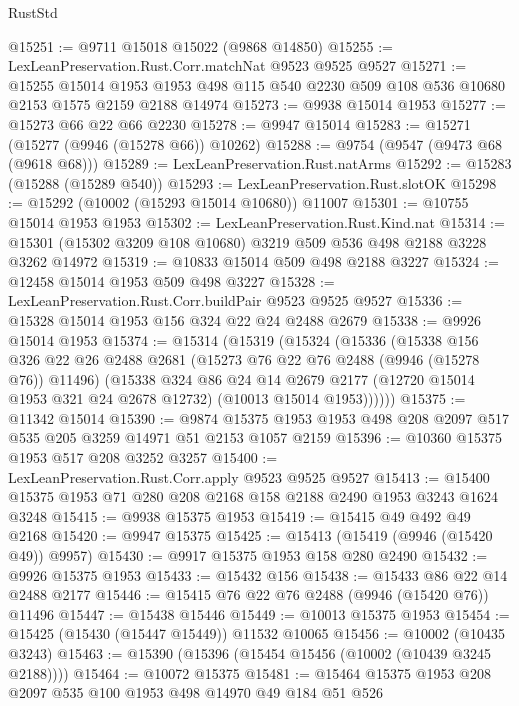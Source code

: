 \begin{lexlean}{RustStd}
\begin{coremodule}
@15251 := @9711 @15018 @15022 (@9868 @14850)
@15255 := LexLeanPreservation.Rust.Corr.matchNat @9523 @9525 @9527
@15271 := @15255
    @15014
    @1953
    @1953
    @498
    @115
    @540
    @2230
    @509
    @108
    @536
    @10680
    @2153
    @1575
    @2159
    @2188
    @14974
@15273 := @9938 @15014 @1953
@15277 := @15273 @66 @22 @66 @2230
@15278 := @9947 @15014
@15283 := @15271 (@15277 (@9946 (@15278 @66)) @10262)
@15288 := @9754 (@9547 (@9473 @68 (@9618 @68)))
@15289 := LexLeanPreservation.Rust.natArms
@15292 := @15283 (@15288 (@15289 @540))
@15293 := LexLeanPreservation.Rust.slotOK
@15298 := @15292 (@10002 (@15293 @15014 @10680)) @11007
@15301 := @10755 @15014 @1953 @1953
@15302 := LexLeanPreservation.Rust.Kind.nat
@15314 := @15301 (@15302 @3209 @108 @10680) @3219 @509 @536 @498 @2188 @3228 @3262 @14972
@15319 := @10833 @15014 @509 @498 @2188 @3227
@15324 := @12458 @15014 @1953 @509 @498 @3227
@15328 := LexLeanPreservation.Rust.Corr.buildPair @9523 @9525 @9527
@15336 := @15328 @15014 @1953 @156 @324 @22 @24 @2488 @2679
@15338 := @9926 @15014 @1953
@15374 := @15314
    (@15319
      (@15324
        (@15336
          (@15338
            @156
            @326
            @22
            @26
            @2488
            @2681
            (@15273 @76 @22 @76 @2488 (@9946 (@15278 @76)) @11496)
            (@15338
              @324
              @86
              @24
              @14
              @2679
              @2177
              (@12720 @15014 @1953 @321 @24 @2678 @12732)
              (@10013 @15014 @1953))))))
@15375 := @11342 @15014
@15390 := @9874 @15375 @1953 @1953 @498 @208 @2097 @517 @535 @205 @3259 @14971 @51 @2153 @1057 @2159
@15396 := @10360 @15375 @1953 @517 @208 @3252 @3257
@15400 := LexLeanPreservation.Rust.Corr.apply @9523 @9525 @9527
@15413 := @15400 @15375 @1953 @71 @280 @208 @2168 @158 @2188 @2490 @1953 @3243 @1624 @3248
@15415 := @9938 @15375 @1953
@15419 := @15415 @49 @492 @49 @2168
@15420 := @9947 @15375
@15425 := @15413 (@15419 (@9946 (@15420 @49)) @9957)
@15430 := @9917 @15375 @1953 @158 @280 @2490
@15432 := @9926 @15375 @1953
@15433 := @15432 @156
@15438 := @15433 @86 @22 @14 @2488 @2177
@15446 := @15415 @76 @22 @76 @2488 (@9946 (@15420 @76)) @11496
@15447 := @15438 @15446
@15449 := @10013 @15375 @1953
@15454 := @15425 (@15430 (@15447 @15449)) @11532 @10065
@15456 := @10002 (@10435 @3243)
@15463 := @15390 (@15396 (@15454 @15456 (@10002 (@10439 @3245 @2188))))
@15464 := @10072 @15375
@15481 := @15464
    @15375
    @1953
    @208
    @2097
    @535
    @100
    @1953
    @498
    @14970
    @49
    @184
    @51
    @526

\end{coremodule}
\end{lexlean}
